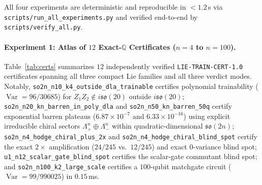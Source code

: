\documentclass[11pt,a4paper]{article}
\theoremstyle{definition}
\theoremstyle{remark}
\newcommand{\QQ}{\mathbb{Q}}
\newcommand{\Var}{\operatorname{Var}}
\newcommand{\so}{\mathfrak{so}}
\newcommand{\certschema}{\texttt{LIE-TRAIN-CERT-1.0}}
\begin{document}
All four experiments are deterministic and reproducible in $<1.2$\,s via \texttt{scripts/run\_\allowbreak all\_\allowbreak experiments.py} and verified end-to-end by \texttt{scripts/verify\_all.py}.

\paragraph{Experiment 1: Atlas of $12$ Exact-$\QQ$ Certificates ($n=4$ to $n=100$).}
Table~\ref{tab:certs} summarizes $12$ independently verified \certschema{} certificates spanning all three compact Lie families and all three verdict modes. Notably, \texttt{so2n\_n10\_k4\_\allowbreak outside\_dla\_trainable} certifies polynomial trainability ($\Var = 96/30685$) for $Z_1 Z_2 \notin i\so(20)$ outside $i\so(20)$; \texttt{so2n\_n20\_kn\_\allowbreak barren\_in\_poly\_dla} and \texttt{so2n\_n50\_kn\_\allowbreak barren\_50q} certify exponential barren plateaus ($6.87\times 10^{-7}$ and $6.33\times 10^{-16}$) using explicit irreducible chiral sectors $\Lambda^n_+ \oplus \Lambda^n_-$ within quadratic-dimensional $\so(2n)$; \texttt{so2n\_n4\_hodge\_\allowbreak chiral\_plus\_2x} and \texttt{so2n\_n4\_hodge\_\allowbreak chiral\_blind\_spot} certify the exact $2\times$ amplification ($24/245$ vs.\ $12/245$) and exact $0$-variance blind spot; \texttt{u1\_n12\_scalar\_\allowbreak gate\_blind\_spot} certifies the scalar-gate commutant blind spot; and \texttt{so2n\_n100\_k2\_\allowbreak large\_scale} certifies a $100$-qubit matchgate circuit ($\Var = 99/990025$) in $0.15$\,ms.
\end{document}
